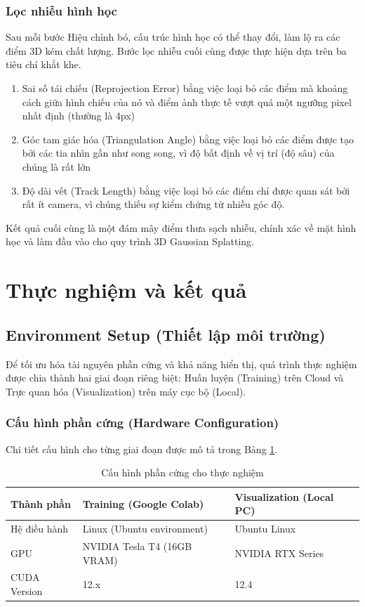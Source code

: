\subsubsection{Lọc nhiễu hình học}
Sau mỗi bước Hiệu chỉnh bó, cấu trúc hình học có thể thay đổi, làm lộ ra các điểm 3D kém chất lượng. Bước lọc nhiễu cuối cùng được thực hiện dựa trên ba tiêu chí khắt khe. 

\begin{enumerate}
    \item Sai số tái chiếu (Reprojection Error) bằng việc loại bỏ các điểm mà khoảng cách giữa hình chiếu của nó và điểm ảnh thực tế vượt quá một ngưỡng pixel nhất định (thường là 4px)
    \item Góc tam giác hóa (Triangulation Angle) bằng việc loại bỏ các điểm được tạo bởi các tia nhìn gần như song song, vì độ bất định về vị trí (độ sâu) của chúng là rất lớn
    \item Độ dài vết (Track Length) bằng việc loại bỏ các điểm chỉ được quan sát bởi rất ít camera, vì chúng thiếu sự kiểm chứng từ nhiều góc độ.
\end{enumerate}

Kết quả cuối cùng là một đám mây điểm thưa sạch nhiễu, chính xác về mặt hình học và làm đầu vào cho quy trình 3D Gaussian Splatting.

\section{Thực nghiệm và kết quả}

\subsection{Environment Setup (Thiết lập môi trường)}
Để tối ưu hóa tài nguyên phần cứng và khả năng hiển thị, quá trình thực nghiệm được chia thành hai giai đoạn riêng biệt: Huấn luyện (Training) trên Cloud và Trực quan hóa (Visualization) trên máy cục bộ (Local).

\subsubsection{Cấu hình phần cứng (Hardware Configuration)}
Chi tiết cấu hình cho từng giai đoạn được mô tả trong Bảng \ref{tab:hardware}.

\begin{table}[h]
\centering
\caption{Cấu hình phần cứng cho thực nghiệm}
\label{tab:hardware}
\vspace{0.2cm}
\begin{tabular}{@{}lll@{}}
\toprule
\textbf{Thành phần} & \textbf{Training (Google Colab)} & \textbf{Visualization (Local PC)} \\ \midrule
Hệ điều hành & Linux (Ubuntu environment) & Ubuntu Linux \\
GPU & NVIDIA Tesla T4 (16GB VRAM) & NVIDIA RTX Series \\
CUDA Version & 12.x & 12.4 \\ \bottomrule
\end{tabular}
\end{table}

